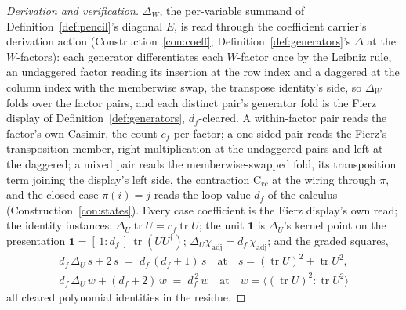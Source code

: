 \documentclass[11pt]{article}
\theoremstyle{definition}
\newcommand{\tr}{\operatorname{tr}}
\begin{document}
\begin{proof}[Derivation and verification]
$\Delta_W$, the per-variable summand of Definition~\ref{def:pencil}'s
diagonal $E$, is read through
the coefficient carrier's derivation action
(Construction~\ref{con:coeff}; Definition~\ref{def:generators}'s
$\Delta$ at the $W$-factors): each generator differentiates each
$W$-factor once by the Leibniz rule, an undaggered factor reading its
insertion at the row index and a daggered at the column index with the
memberwise swap, the transpose identity's side, so $\Delta_W$ folds over
the factor pairs, and each distinct pair's generator fold is the
Fierz display of Definition~\ref{def:generators}, $d_f$-cleared. A
within-factor pair reads the factor's own Casimir, the count $c_f$
per factor; a one-sided pair reads the Fierz's transposition member, right
multiplication at the undaggered pairs and left at the daggered; a
mixed pair reads the memberwise-swapped fold, its transposition term
joining the display's left side, the contraction $\mathrm{C}_{rc}$ at
the wiring through $\pi$, and the closed case $\pi(i)=j$ reads the
loop value $d_f$ of the calculus (Construction~\ref{con:states}). Every
case coefficient is the Fierz display's own read; the identity
instances: $\Delta_U\tr U=c_f\tr
U$; the unit $\mathbf 1$ is $\Delta_U$'s kernel point on the
presentation
$\mathbf 1=[\,1:d_f\,]\,\tr(UU^{\dagger})$; $\Delta_U\chi_{\mathrm{adj}}
=d_f\,\chi_{\mathrm{adj}}$; and the graded squares,
\begin{gather*}
d_f\,\Delta_U\,s+2\,s\;=\;d_f\,(d_f+1)\,s
\quad\text{at}\quad s=(\tr U)^2+\tr U^2 ,\\
d_f\,\Delta_U\,w+(d_f+2)\,w\;=\;d_f^{\,2}\,w
\quad\text{at}\quad w=\big\langle(\tr U)^2\!:\!\tr U^2\big\rangle
\end{gather*}
all cleared polynomial
identities in the residue.
\end{proof}
\end{document}
